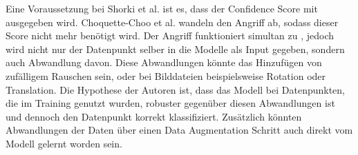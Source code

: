 Eine Voraussetzung bei Shorki et al. \cite{P-2} ist es, dass der Confidence Score mit ausgegeben wird.
Choquette-Choo et al. \cite{P-7} wandeln den Angriff ab, sodass dieser Score nicht mehr benötigt wird.
Der Angriff funktioniert simultan zu \cite{P-2}, jedoch wird nicht nur der Datenpunkt selber in die Modelle als Input gegeben, sondern auch Abwandlung davon. 
Diese Abwandlungen könnte das Hinzufügen von zufälligem Rauschen sein, oder bei Bilddateien beispielsweise Rotation oder Translation.
Die Hypothese der Autoren ist, dass das Modell bei Datenpunkten, die im Training genutzt wurden, robuster gegenüber diesen Abwandlungen ist und dennoch den Datenpunkt korrekt klassifiziert.
Zusätzlich könnten Abwandlungen der Daten über einen Data Augmentation Schritt auch direkt vom Modell gelernt worden sein.

